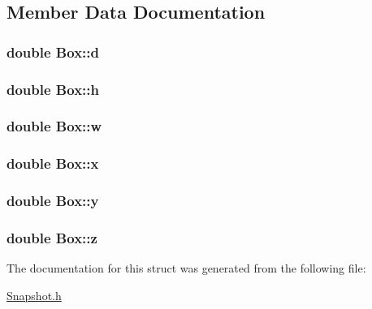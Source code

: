 \subsection{Member Data Documentation}
\hypertarget{structBox_a512cdd18477dcf4b59df213935b9ad9d}{}
\subsubsection[{d}]{\setlength{\rightskip}{0pt plus 5cm}double Box\+::d}\label{structBox_a512cdd18477dcf4b59df213935b9ad9d}
\hypertarget{structBox_a6ddf8580fc6085be5311720212d966f0}{}
\subsubsection[{h}]{\setlength{\rightskip}{0pt plus 5cm}double Box\+::h}\label{structBox_a6ddf8580fc6085be5311720212d966f0}
\hypertarget{structBox_a52c7a693671af3a6b9e713c989c28a1b}{}
\subsubsection[{w}]{\setlength{\rightskip}{0pt plus 5cm}double Box\+::w}\label{structBox_a52c7a693671af3a6b9e713c989c28a1b}
\hypertarget{structBox_a3527f292bb4bde18936b2dfc76097ea0}{}
\subsubsection[{x}]{\setlength{\rightskip}{0pt plus 5cm}double Box\+::x}\label{structBox_a3527f292bb4bde18936b2dfc76097ea0}
\hypertarget{structBox_a4a11736337f490a1e0903c4f12badf05}{}
\subsubsection[{y}]{\setlength{\rightskip}{0pt plus 5cm}double Box\+::y}\label{structBox_a4a11736337f490a1e0903c4f12badf05}
\hypertarget{structBox_adfc8262c4a354b354ef319e592980138}{}
\subsubsection[{z}]{\setlength{\rightskip}{0pt plus 5cm}double Box\+::z}\label{structBox_adfc8262c4a354b354ef319e592980138}


The documentation for this struct was generated from the following file\+:\begin{DoxyCompactItemize}
\item 
\hyperlink{Snapshot_8h}{Snapshot.\+h}\end{DoxyCompactItemize}
